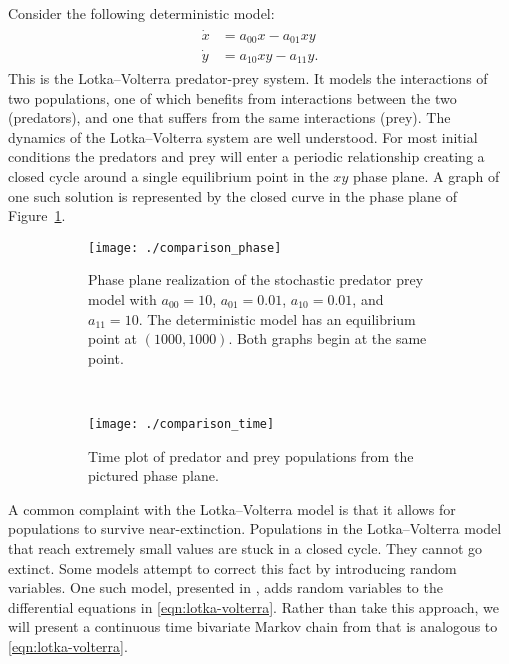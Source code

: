 \documentclass[12pt]{article}
\theoremstyle{definition}
\begin{document}
Consider the following deterministic model:
\begin{align}
\label{eqn:lotka-volterra}
\begin{split}
    \dot{x} &= a_{00} x - a_{01} xy \\
    \dot{y} &= a_{10} xy - a_{11} y.
\end{split}
\end{align}
This is the Lotka--Volterra predator-prey system. It models the interactions of
two populations, one of which benefits from interactions between the two
(predators), and one that suffers from the same interactions (prey). The
dynamics of the Lotka--Volterra system are well understood. For most initial
conditions the predators and prey will enter a periodic relationship creating a
closed cycle around a single equilibrium point in the $xy$ phase plane. A graph
of one such solution is represented by the closed curve in the phase plane of
Figure~\ref{fig:comparison}.

\begin{figure}[p]
    \centering
    \begin{subfigure}[t]{.5\textwidth}
        \texttt{[image: ./comparison\_phase]}
        \caption{Phase plane realization of the stochastic predator prey model
        with $a_{00} = 10$, $a_{01} = 0.01$, $a_{10} = 0.01$, and $a_{11} =
        10$. The deterministic model has an equilibrium point at $(1000,
        1000)$. Both graphs begin at the same point.}
    \end{subfigure}%
    ~~~ %
    \begin{subfigure}[t]{.5\textwidth}
        \texttt{[image: ./comparison\_time]}
        \caption{Time plot of predator and prey populations from the pictured
        phase plane.}
    \end{subfigure}
    \caption{}
    \label{fig:comparison}
\end{figure}

A common complaint with the Lotka--Volterra model is that it allows for
populations to survive near-extinction. Populations in the Lotka--Volterra
model that reach extremely small values are stuck in a closed cycle. They
cannot go extinct. Some models attempt to correct this fact by introducing
random variables. One such model, presented in \cite{mao2003asymptotic}, adds
random variables to the differential equations in \eqref{eqn:lotka-volterra}.
Rather than take this approach, we will present a continuous time bivariate
Markov chain from \cite{allen2010introduction} that is analogous to
\eqref{eqn:lotka-volterra}.
\end{document}
